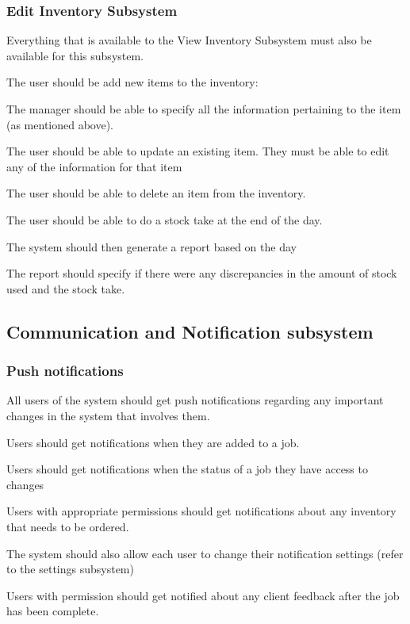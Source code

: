 \documentclass{article}
\begin{document}
	\subsubsection*{Edit Inventory Subsystem}	
	\begin{list}{R}{}
		\item Everything that is available to the View Inventory Subsystem must also be available for this subsystem.
		\item The user should be add new items to the inventory:
		\begin{list}{R.}{}
			\item The manager should be able to specify all the information pertaining to the item (as mentioned above).
		\end{list}
		\item The user should be able to update an existing item. They must be able to edit any of the information for that item
		\item The user should be able to delete an item from the inventory.
	    \item The user should be able to do a stock take at the end of the day.
	    \begin{list}{R.}{}
	    	\item The system should then generate a report based on the day 
	    	\item The report should specify if there were any discrepancies in the amount of stock used and the stock take.
	    \end{list}
	\end{list}
	
	
	\subsection*{Communication and Notification subsystem}	
		\subsubsection*{Push notifications}	
		\begin{list}{R}{}
			\item All users of the system should get push notifications regarding any important changes in the system that involves them.
			\item Users should get notifications when they are added to a job.
			\item Users should get notifications when the status of a job they have access to changes
			\item Users with appropriate permissions should get notifications about any inventory that needs to be ordered.
			\item The system should also allow each user to change their notification settings (refer to the settings subsystem)
			\item Users with permission should get notified about any client feedback after the job has been complete.
		\end{list}
		
\end{document}
